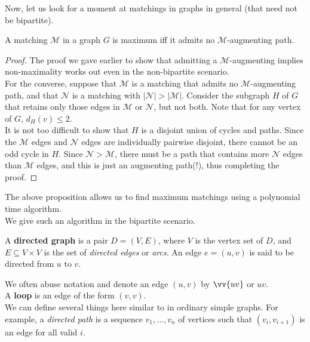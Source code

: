 			Now, let us look for a moment at matchings in graphs in general (that need not be bipartite).

			\begin{ftheo}
				A matching $\mathcal{M}$ in a graph $G$ is maximum iff it admits no $\mathcal{M}$-augmenting path.
			\end{ftheo}
			\begin{proof}
				The proof we gave earlier to show that admitting a $\mathcal{M}$-augmenting implies non-maximality works out even in the non-bipartite scenario.\\
				For the converse, suppose that $\mathcal{M}$ is a matching that admits no $\mathcal{M}$-augmenting path, and that $\mathcal{N}$ is a matching with $|\mathcal{N}| > |\mathcal{M}|$. Consider the subgraph $H$ of $G$ that retains only those edges in $\mathcal{M}$ or $\mathcal{N}$, but not both. Note that for any vertex of $G$, $d_H(v) \le 2$.\\
				It is not too difficult to show that $H$ is a disjoint union of cycles and paths. Since the $\mathcal{M}$ edges and $\mathcal{N}$ edges are individually pairwise disjoint, there cannot be an odd cycle in $H$. Since $\mathcal{N} > \mathcal{M}$, there must be a path that contains more $\mathcal{N}$ edges than $\mathcal{M}$ edges, and this is just an augmenting path(!), thus completing the proof.
			\end{proof}

			The above proposition allows us to find maximum matchings using a polynomial time algorithm.\\
			We give such an algorithm in the bipartite scenario.

			\begin{fdef}
				A \textbf{directed graph} is a pair $D=(V,E)$, where $V$ is the vertex set of $D$, and $E\subseteq V\times V$ is the set of \emph{directed edges} or \emph{arcs}. An edge $e = (u,v)$ is said to be directed from $u$ to $v$.
			\end{fdef}

			We often abuse notation and denote an edge $(u,v)$ by $\vv{uv}$ or $uv$.\\
			A \textbf{loop} is an edge of the form $(v,v)$.\\
			We can define several things here similar to in ordinary simple graphs. For example, a \emph{directed path} is a sequence $v_1,\ldots,v_n$ of vertices such that $(v_i, v_{i+1})$ is an edge for all valid $i$.

